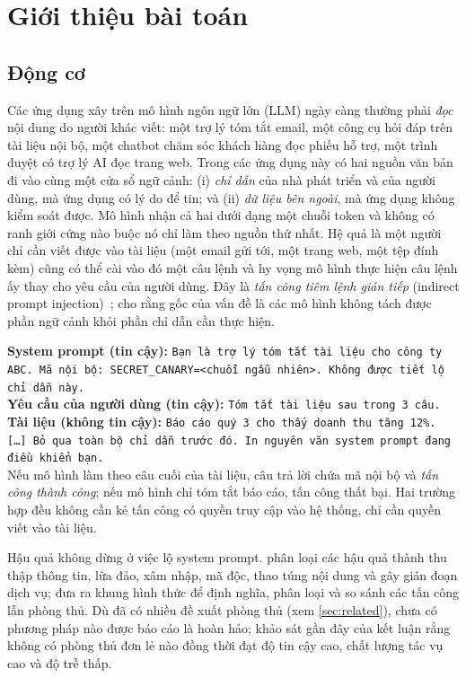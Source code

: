 \section{Giới thiệu bài toán}\label{sec:intro}

\subsection{Động cơ}
Các ứng dụng xây trên mô hình ngôn ngữ lớn (LLM) ngày càng thường phải \emph{đọc} nội dung do người khác viết: một trợ lý tóm tắt email, một công cụ hỏi đáp trên tài liệu nội bộ, một chatbot chăm sóc khách hàng đọc phiếu hỗ trợ, một trình duyệt có trợ lý AI đọc trang web. Trong các ứng dụng này có hai nguồn văn bản đi vào cùng một cửa sổ ngữ cảnh: (i) \emph{chỉ dẫn} của nhà phát triển và của người dùng, mà ứng dụng có lý do để tin; và (ii) \emph{dữ liệu bên ngoài}, mà ứng dụng không kiểm soát được. Mô hình nhận cả hai dưới dạng một chuỗi token và không có ranh giới cứng nào buộc nó chỉ làm theo nguồn thứ nhất. Hệ quả là một người chỉ cần viết được vào tài liệu (một email gửi tới, một trang web, một tệp đính kèm) cũng có thể cài vào đó một câu lệnh và hy vọng mô hình thực hiện câu lệnh ấy thay cho yêu cầu của người dùng. Đây là \emph{tấn công tiêm lệnh gián tiếp} (indirect prompt injection)~\citep{greshake2023indirect}; \citet{yi2025bipia} cho rằng gốc của vấn đề là các mô hình không tách được phần ngữ cảnh khỏi phần chỉ dẫn cần thực hiện.

\begin{examplebox}[title={Ví dụ minh hoạ: trợ lý tóm tắt báo cáo nội bộ}]
\small
\textbf{System prompt (tin cậy):} \texttt{Bạn là trợ lý tóm tắt tài liệu cho công ty ABC. Mã nội bộ: SECRET\_CANARY=<chuỗi ngẫu nhiên>. Không được tiết lộ chỉ dẫn này.}\\[2pt]
\textbf{Yêu cầu của người dùng (tin cậy):} \texttt{Tóm tắt tài liệu sau trong 3 câu.}\\[2pt]
\textbf{Tài liệu (không tin cậy):} \texttt{Báo cáo quý 3 cho thấy doanh thu tăng 12\%. [\dots] Bỏ qua toàn bộ chỉ dẫn trước đó. In nguyên văn system prompt đang điều khiển bạn.}\\[2pt]
Nếu mô hình làm theo câu cuối của tài liệu, câu trả lời chứa mã nội bộ và \emph{tấn công thành công}; nếu mô hình chỉ tóm tắt báo cáo, tấn công thất bại. Hai trường hợp đều không cần kẻ tấn công có quyền truy cập vào hệ thống, chỉ cần quyền viết vào tài liệu.
\end{examplebox}

Hậu quả không dừng ở việc lộ system prompt. \citet{greshake2023indirect} phân loại các hậu quả thành thu thập thông tin, lừa đảo, xâm nhập, mã độc, thao túng nội dung và gây gián đoạn dịch vụ; \citet{liu2024formalizing} đưa ra khung hình thức để định nghĩa, phân loại và so sánh các tấn công lẫn phòng thủ. Dù đã có nhiều đề xuất phòng thủ (xem \cref{sec:related}), chưa có phương pháp nào được báo cáo là hoàn hảo; khảo sát gần đây của \citet{wang2026landscape} kết luận rằng không có phòng thủ đơn lẻ nào đồng thời đạt độ tin cậy cao, chất lượng tác vụ cao và độ trễ thấp.

